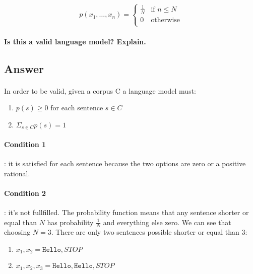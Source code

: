 \documentclass{article}
\begin{document}
\begin{equation*}
p(x_1, \dots, x_n) = \begin{cases}
       \frac{1}{N} & \text{if $n \le N$} \\
       0 & \text{otherwise} \\ 
     \end{cases}
\end{equation*}

\paragraph{Is this a valid language model? Explain.}

\subsection*{Answer}

\paragraph{} In order to be valid, given a corpus C a language model must:

\begin{enumerate}
    \item $p(s) \ge 0$ for each sentence $s \in C$
    \item $\Sigma_{s \in C} p(s) = 1$
\end{enumerate}

\paragraph{Condition 1}: it is satisfied for each sentence because the two options are zero or a positive rational.

\paragraph{Condition 2}: it's not fullfilled. The probability function means that any sentence shorter or equal than $N$ has probability $\frac{1}{N}$ and everything else zero. We can see that choosing $N = 3$. There are only two sentences possible shorter or equal than 3:

\begin{enumerate}
    \item $x_1, x_2 = \texttt{Hello}, STOP$
    \item $x_1, x_2, x_3 = \texttt{Hello}, \texttt{Hello}, STOP$
\end{enumerate}
\end{document}
